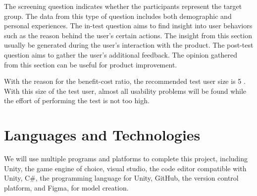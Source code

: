 \documentclass[12pt,oneside,openright,a4paper]{cpe-english-project}
\begin{document}
\hspace{2em}The screening question indicates whether the participants represent the target group. The data from this type of question includes both demographic and personal experiences. The in-test question aims to find insight into user behaviors such as the reason behind the user's certain actions. The insight from this section usually be generated during the user's interaction with the product. The post-test question aims to gather the user's additional feedback. The opinion gathered from this section can be useful for product improvement.

\hspace{2em}With the reason for the benefit-cost ratio, the recommended test user size is 5 \cite{jakob2012usability}. With this size of the test user, almost all usability problems will be found while the effort of performing the test is not too high.

\section{Languages and Technologies}
We will use multiple programs and platforms to complete this project, including Unity, the game engine of choice, visual studio, the code editor compatible with Unity, C\#, the programming language for Unity, GitHub, the version control platform, and Figma, for model creation.
\end{document}
